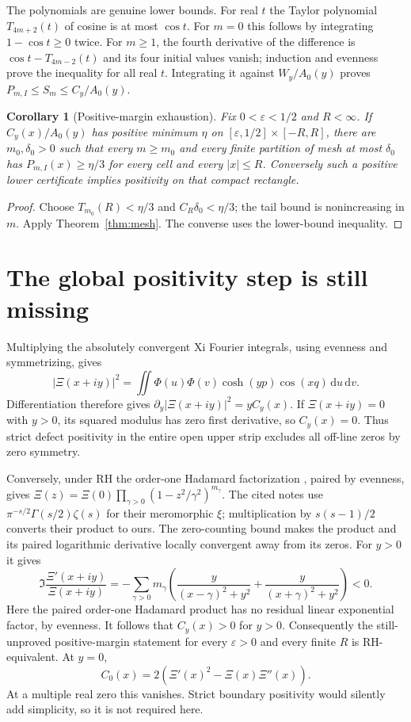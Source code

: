 \documentclass[11pt]{article}
\newtheorem{corollary}[theorem]{Corollary}
\theoremstyle{remark}\newtheorem{remark}[theorem]{Remark}
\newcommand{\dd}{\,\mathrm d}
\begin{document}
The polynomials are genuine lower bounds. For real $t$ the Taylor
polynomial $T_{4m+2}(t)$ of cosine is at most $\cos t$.
For $m=0$ this follows by integrating $1-\cos t\ge0$ twice.
For $m\ge1$, the fourth derivative of the difference is
$\cos t-T_{4m-2}(t)$ and its four initial values vanish; induction and
evenness prove the inequality for all real $t$. Integrating it against
$W_y/A_0(y)$ proves $P_{m,I}\le S_m\le C_y/A_0(y)$.

\begin{corollary}[Positive-margin exhaustion]
Fix $0<\varepsilon<1/2$ and $R<\infty$. If $C_y(x)/A_0(y)$ has positive
minimum $\eta$ on $[\varepsilon,1/2]\times[-R,R]$, there are
$m_0,\delta_0>0$ such that every $m\ge m_0$ and every finite partition
of mesh at most $\delta_0$ has $P_{m,I}(x)\ge\eta/3$ for every cell and
every $|x|\le R$. Conversely such a positive lower certificate implies
positivity on that compact rectangle.
\end{corollary}
\begin{proof}
Choose $T_{m_0}(R)<\eta/3$ and $C_R\delta_0<\eta/3$; the tail bound is
nonincreasing in $m$. Apply Theorem~\ref{thm:mesh}. The converse uses
the lower-bound inequality.
\end{proof}

\section{The global positivity step is still missing}
Multiplying the absolutely convergent Xi Fourier integrals, using evenness
and symmetrizing, gives
\[
 |\Xi(x+iy)|^2=\iint\Phi(u)\Phi(v)\cosh(yp)\cos(xq)\dd u\dd v.
\]
Differentiation therefore gives
$\partial_y|\Xi(x+iy)|^2=yC_y(x)$.
If $\Xi(x+iy)=0$ with $y>0$, its squared modulus has zero first
derivative, so $C_y(x)=0$. Thus strict defect positivity in the entire
open upper strip excludes all off-line zeros by zero symmetry.

Conversely, under RH the order-one Hadamard factorization
\cite[pp.~1--2, equation (1), and p.~5, Exercise 2]{Elkies}, paired by
evenness, gives
$\Xi(z)=\Xi(0)\prod_{\gamma>0}(1-z^2/\gamma^2)^{m_\gamma}$.
The cited notes use $\pi^{-s/2}\Gamma(s/2)\zeta(s)$ for their meromorphic
$\xi$; multiplication by $s(s-1)/2$ converts their product to ours.
The zero-counting bound makes the product and its paired logarithmic
derivative locally convergent away from its zeros. For $y>0$ it gives
\[
 \Im\frac{\Xi'(x+iy)}{\Xi(x+iy)}
 =-\sum_{\gamma>0}m_\gamma
 \left(\frac{y}{(x-\gamma)^2+y^2}+
       \frac{y}{(x+\gamma)^2+y^2}\right)<0.
\]
Here the paired order-one Hadamard product has no residual linear
exponential factor, by evenness. It follows that $C_y(x)>0$ for $y>0$.
Consequently the still-unproved positive-margin statement for every
$\varepsilon>0$ and every finite $R$ is RH-equivalent. At $y=0$,
\[
 C_0(x)=2(\Xi'(x)^2-\Xi(x)\Xi''(x)).
\]
At a multiple real zero this vanishes. Strict boundary positivity would
silently add simplicity, so it is not required here.
\end{document}
